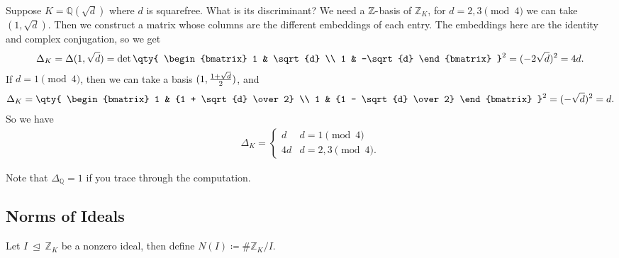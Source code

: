 \begin{example}[?]

Suppose \(K = {\mathbb{Q}}( \sqrt{d} )\) where \(d\) is squarefree. What
is its discriminant? We need a \({\mathbb{Z}}{\hbox{-}}\)basis of
\({\mathbb{Z}}_K\), for \(d=2,3 \pmod 4\) we can take
\((1, \sqrt{d} )\). Then we construct a matrix whose columns are the
different embeddings of each entry. The embeddings here are the identity
and complex conjugation, so we get
\begin{align*}
\Delta_K = \Delta(1, \sqrt{ d} )
= 
\det 
\qty{
\begin{bmatrix}
1 & \sqrt{d} 
\\
 1 & -\sqrt{d} 
\end{bmatrix}
}^2
= (-2 \sqrt{d} )^2 = 4d
.\end{align*}
If \(d = 1 \pmod 4\), then we can take a basis
\((1, {1 + \sqrt{d} \over 2})\), and
\begin{align*}
\Delta_{K}
=
\qty{
\begin{bmatrix}
1 & {1 + \sqrt{d} \over 2}
\\
1 & {1 - \sqrt{d} \over 2}
\end{bmatrix}
}^2
= (- \sqrt{d} )^2 = d
.\end{align*}
So we have
\begin{align*}
\Delta_K = 
\begin{cases}
d & d = 1 \pmod 4 
\\
4d & d = 2,3 \pmod 4 .
\end{cases}
\end{align*}

\end{example}

\begin{remark}

Note that \(\Delta_{\mathbb{Q}}= 1\) if you trace through the
computation.

\end{remark}

\hypertarget{norms-of-ideals}{%
\subsection{Norms of Ideals}\label{norms-of-ideals}}

\begin{definition}[?]

Let \(I {~\trianglelefteq~}{\mathbb{Z}}_K\) be a nonzero ideal, then
define \(N(I) \coloneqq\# {\mathbb{Z}}_K/I\).

\end{definition}

